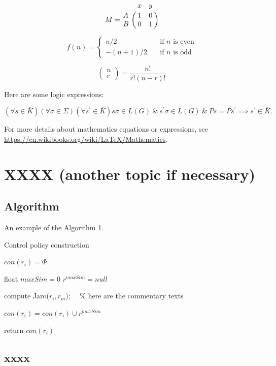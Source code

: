 \documentclass{article}
\begin{document}
\[
M = \bordermatrix{~ & x & y \cr
                  A & 1 & 0 \cr
                  B & 0 & 1 \cr}
\]


\[ f(n) =
  \begin{cases}
    n/2       & \quad \text{if } n \text{ is even}\\
    -(n+1)/2  & \quad \text{if } n \text{ is odd}
  \end{cases}
\]



\[
\left(
    \begin{array}{c}
      n \\
      r
    \end{array}
  \right) = \frac{n!}{r!(n-r)!}
\]



Here are some logic expressions:


$$
(\forall s\in\overline{K})(\forall\sigma\in\Sigma)(\forall s^\prime\in\overline{K})s\sigma\in L(G)~\&~s^\prime\sigma\in L(G)~\&~Ps=Ps^\prime\implies s^
\prime\in\overline{K}.
$$




For more details about mathematics equations or expressions, see \url{https://en.wikibooks.org/wiki/LaTeX/Mathematics}.

\section{XXXX (another topic if necessary)}

\subsection{Algorithm}

An example of the Algorithm 1.


\begin{algorithm} 
	\SetAlgoVlined 
	\caption{Control policy construction} 
	$con(r_i)= \Phi$\; 
	{ 
		float $maxSim=0$\; 
		$r^{maxSim}=null$\; 
		{ 
			compute Jaro($r_i,r_m$);~~ \% here are the commentary texts 

		} 
		$con(r_i)=con(r_i)\cup {r^{maxSim}}$\; 
	} 
	return $con(r_i)$\; 
\end{algorithm}


\subsection{xxxx}
\end{document}
